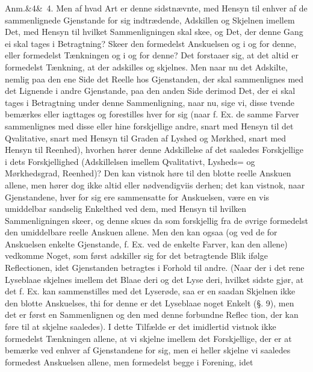 \documentclass[12pt]{book}
\def\sperr#1{#1}%
\def\textit#1{#1}%
\newcommand{\sperr}[1]{\textls[180]{#1}}
\newcommand{\anm}[1]{%
  \par\vspace{0.5\baselineskip}%
  \noindent\hspace{\parindent}\sperr{Anm.}\ifx&#1&\else~\textit{#1}.\fi
  \enspace\ignorespaces
}
\newcommand{\opage}[1]{\marginnote{\footnotesize\textit{[#1]}}}
\begin{document}
\anm{4} Men af hvad Art er denne sidstnævnte, med Hensyn til enhver af de
sammenlignede Gjenstande for sig indtrædende, Adskillen og Skjelnen imellem Det, med
Hensyn til hvilket Sammenligningen skal skee, og Det, der denne Gang ei skal tages i
Betragtning? Skeer den formedelst Anskuelsen og i og for denne, eller formedelst
Tænkningen og i og for denne? Det forstaaer sig, at det altid er formedelst Tænkning,
at der adskilles og skjelnes. Men naar nu det Adskilte, nemlig paa den ene Side det
Reelle hos Gjenstanden, der skal sammenlignes med det Lignende i andre Gjenstande,
paa den anden Side derimod Det, der ei skal tages
\opage{185} i Betragtning under denne Sammenligning, naar nu, sige vi, disse tvende bemærkes
eller iagttages og forestilles hver for sig (naar f. Ex. de samme Farver
sammenlignes med disse eller hine forskjellige andre, snart med Hensyn til det
Qvalitative, snart med Hensyn til Graden af Lyshed og Mørkhed, snart med Hensyn til
Reenhed), hvorhen hører denne Adskillelse af det saaledes Forskjellige i dets
Forskjellighed (Adskillelsen imellem Qvalitativt, Lysheds= og Mørkhedsgrad,
Reenhed)? Den kan vistnok høre til den blotte reelle Anskuen allene, men hører dog
ikke altid eller nødvendigviis derhen; det kan vistnok, naar Gjenstandene, hver for
sig ere sammensatte for Anskuelsen, være en vis umiddelbar sandselig Enkelthed ved
dem, med Hensyn til hvilken Sammenligningen skeer, og denne skues da som forskjellig
fra de øvrige formedelst den umiddelbare reelle Anskuen allene. Men den kan ogsaa
(og ved de for Anskuelsen enkelte Gjenstande, f. Ex. ved de enkelte Farver, kan den
allene) vedkomme Noget, som først adskiller sig for det betragtende Blik ifølge
Reflectionen, idet Gjenstanden betragtes i Forhold til andre. (Naar der i det rene
Lyseblaae skjelnes imellem det Blaae deri og det Lyse deri, hvilket sidste gjør, at
det f. Ex. kan sammenstilles med det Lyserøde, saa er en saadan Skjelnen ikke den
blotte Anskuelses, thi for denne er det Lyseblaae noget Enkelt (§. 9), men det er
først en Sammenlignen og den med denne forbundne Reflec%
\opage{186}tion, der kan føre til at skjelne saaledes). I dette Tilfælde er det imidlertid
vistnok ikke formedelst Tænkningen allene, at vi skjelne imellem det Forskjellige,
der er at bemærke ved enhver af Gjenstandene for sig, men ei heller skjelne vi
saaledes formedest Anskuelsen allene, men formedelst begge i Forening, idet
\end{document}
